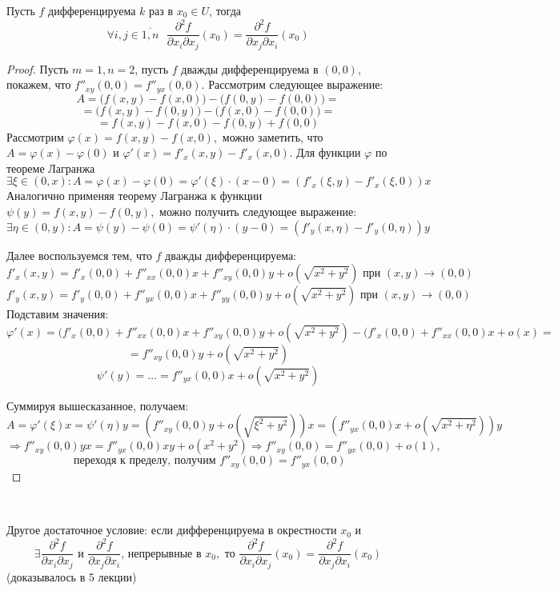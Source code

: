 \begin{theorem}
	Пусть $f$ дифференцируема $k$ раз в $x_0 \in U$, тогда
	\[ \forall i, j \in \overline{1,n} \text{ } \frac{\partial^2 f}{\partial x_i \partial x_j} (x_0) = \frac{\partial^2 f}{\partial x_j \partial x_i}(x_0) \]
	\begin{proof}
		Пусть $m = 1, n = 2$, пусть $f$ дважды дифференцируема в $(0, 0),$  покажем, что $f''_{xy}(0, 0) = f''_{yx}(0, 0)$. Рассмотрим следующее выражение:
\[ A = \Big(f(x, y) - f(x, 0)\Big) - \Big(f(0, y) - f(0, 0)\Big) = \]
	\[ = \Big(f(x, y) - f(0, y)\Big) - \Big(f(x, 0) - f(0, 0)\Big) = \]
	\[ = f(x, y) - f(x, 0) - f(0, y) + f(0, 0) \]
	Рассмотрим $\varphi(x) = f(x, y) - f(x, 0),$ можно заметить, что $A = \varphi(x) - \varphi(0)$ и $\varphi'(x) = f'_x(x, y) - f'_x(x, 0)$. Для функции $\varphi$ по теореме Лагранжа 
		\[ \exists \xi \in (0, x) : A = \varphi(x) - \varphi(0) = \varphi'(\xi) \cdot (x - 0) = (f'_x(\xi, y) - f'_x(\xi, 0)) x  \]
	Аналогично применяя теорему Лагранжа к функции $\psi(y) = f(x, y) - f(0, y),$ можно получить следующее выражение:
		\[ \exists \eta \in (0, y) : A = \psi(y) -\psi(0) = \psi'(\eta) \cdot (y - 0) = (f'_y(x, \eta) - f'_y(0, \eta)) y  \]

	Далее воспользуемся тем, что $f$ дважды дифференцируема:
	\[ f'_x (x, y) = f'_{x}(0, 0) + f''_{xx}(0, 0)x + f''_{xy}(0, 0)y + o(\sqrt{x^2 + y^2}) \text { при } (x, y) \to (0, 0) \]
	\[ f'_y (x, y) = f'_{y}(0, 0) + f''_{yx}(0, 0)x + f''_{yy}(0, 0)y + o(\sqrt{x^2 + y^2}) \text { при } (x, y) \to (0, 0) \]
	Подставим значения:
	\[ \varphi'(x) = (f'_{x}(0, 0) + f''_{xx}(0, 0)x + f''_{xy}(0, 0)y + o(\sqrt{x^2 + y^2}) - (f'_{x}(0, 0) + f''_{xx}(0, 0)x + o(x) = \]
	\[ = f''_{xy}(0, 0)y + o(\sqrt{x^2 + y^2}) \]
	\[ \psi'(y) = \ldots = f''_{yx}(0, 0)x + o(\sqrt{x^2 + y^2}) \]
	
	Суммируя вышесказанное, получаем: 
	\[ A = \varphi'(\xi)x = \psi'(\eta)y = (f''_{xy}(0,0)y + o(\sqrt{\xi^2 + y^2}))x = (f''_{yx}(0,0)x + o(\sqrt{x^2 + \eta^2}))y \]
	\[\Rightarrow f''_{xy}(0,0)yx = f''_{yx}(0,0)xy + o(x^2 + y^2) \Rightarrow f''_{xy}(0,0) = f''_{yx}(0,0) + o(1), \]
	\[ \text{ переходя к пределу, получим } f''_{xy}(0,0) = f''_{yx}(0,0) \]
	\end{proof}\\
\end{theorem}

\begin{remark}
	Другое достаточное условие: если дифференцируема в окрестности $x_0$ и 
	\[ \exists \frac{\partial^2f}{\partial x_i \partial x_j} \text{ и } \frac{\partial^2f}{\partial x_j \partial x_i} \text{, непрерывные в } x_0, \text{ то } \frac{\partial^2f}{\partial x_i \partial x_j}(x_0) = \frac{\partial^2f}{\partial x_j \partial x_i}(x_0) \]
	(доказывалось в 5 лекции)
\end{remark}

